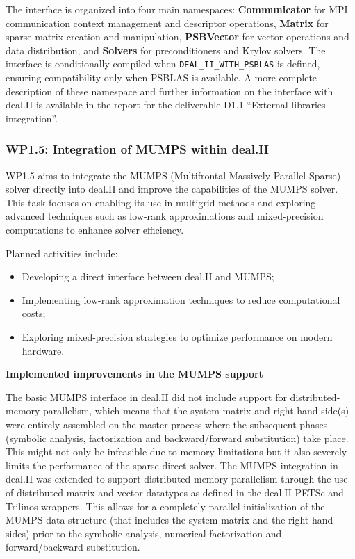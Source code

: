\documentclass[a4paper,12pt, numbers]{article}
\begin{document}
The interface is organized into four main namespaces: \textbf{Communicator} for MPI communication
context management and descriptor operations, \textbf{Matrix} for sparse matrix creation and manipulation,
\textbf{PSBVector} for vector operations and data distribution, and \textbf{Solvers} for preconditioners
and Krylov solvers. The interface is conditionally compiled when \texttt{DEAL\_II\_WITH\_PSBLAS}
is defined, ensuring compatibility only when PSBLAS is available. A more complete description of these namespace and further information on the interface with deal.II is available in the report for the deliverable D1.1 ``External libraries integration''. 

\subsubsection*{WP1.5: Integration of MUMPS within deal.II} %
WP1.5 aims to integrate the MUMPS (Multifrontal Massively Parallel Sparse) solver directly into deal.II and improve the capabilities of the MUMPS solver. This task focuses on enabling its use in multigrid methods and exploring advanced techniques such as low-rank approximations and mixed-precision computations to enhance solver efficiency.

Planned activities include:
\begin{itemize}
\item Developing a direct interface between deal.II and MUMPS;
\item Implementing low-rank approximation techniques to reduce computational costs;
\item Exploring mixed-precision strategies to optimize performance on modern hardware.
\end{itemize}

\noindent\textbf{Implemented improvements in the MUMPS support}

The basic MUMPS interface in deal.II did not include support for
distributed-memory parallelism, which means that the system matrix and
right-hand side(s) were entirely assembled on the master process where
the subsequent phases (symbolic analysis, factorization and
backward/forward substitution) take place. This might not only be
infeasible due to memory limitations but it also severely limits the
performance of the sparse direct solver. The MUMPS integration in
deal.II was extended to support distributed memory parallelism through
the use of distributed matrix and vector datatypes as defined in the
deal.II PETSc and Trilinos wrappers. This allows for a completely
parallel initialization of the MUMPS data structure (that includes the
system matrix and the right-hand sides) prior to the symbolic
analysis, numerical factorization and forward/backward substitution.
\end{document}
